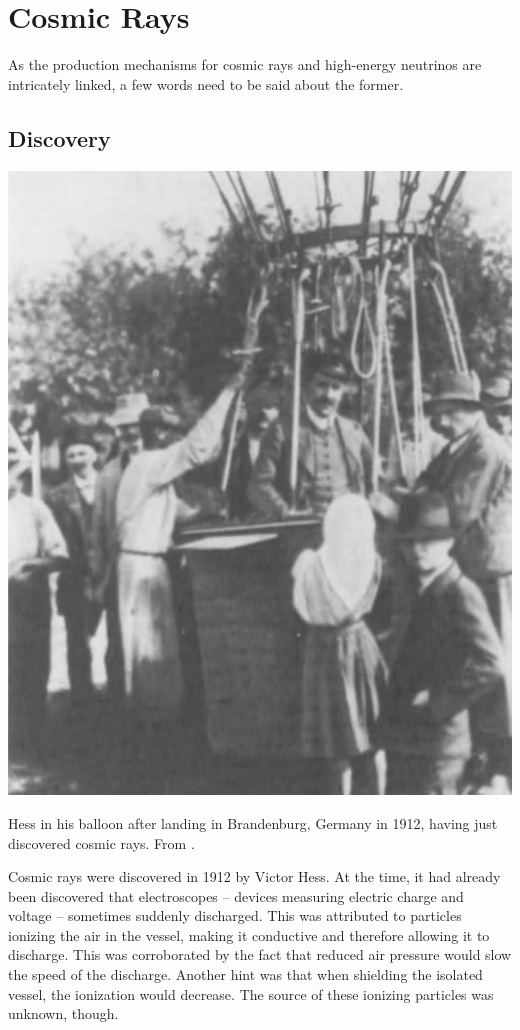 \documentclass[
    a4paper, %
    fontsize=10pt, %
    twoside=false, %
    numbers=noenddot, %
    fontmethod=tex,
]{kaobook}
\begin{document}
\section{Cosmic Rays} \label{cosmic_rays}
As the production mechanisms for cosmic rays and high-energy neutrinos are intricately linked, a few words need to be said about the former.

\subsection{Discovery}
\begin{marginfigure}
    \includegraphics{theory/hess_balloon.png}
    \caption[Hess in his balloon]{Hess in his balloon after landing in Brandenburg, Germany in 1912, having just discovered cosmic rays. From \cite{Steinmaurer1985}.}
\end{marginfigure}
Cosmic rays were discovered in 1912 by Victor Hess. At the time, it had already been discovered that electroscopes -- devices measuring electric charge and voltage -- sometimes suddenly discharged. This was attributed to particles ionizing the air in the vessel, making it conductive and therefore allowing it to discharge. This was corroborated by the fact that reduced air pressure would slow the speed of the discharge. Another hint was that when shielding the isolated vessel, the ionization would decrease. The source of these ionizing particles was unknown, though.
\end{document}
